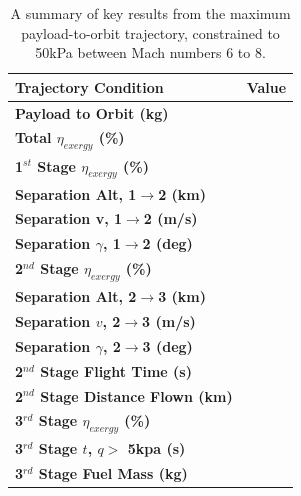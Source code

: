 	\begin{table}[ht]%
	\centering
\begin{tabular}{l c } 
	\hline \textbf{Trajectory Condition}
	& Value

	\\
	\hline \textbf{Payload to Orbit (kg)}
	& \textbf{\PayloadToOrbitqconstrainedNoReturn}
	\\
	\textbf{Total $\eta_{exergy}$ (\%)}
	& \textbf{\totalExergyEffqconstrainedNoReturn}
	\\
	\hline 
	\textbf{1$^{st}$ Stage $\eta_{exergy}$ (\%)}
	& \textbf{\firstExergyEffqconstrainedNoReturn}
	\\
	\textbf{Separation Alt, 1$\rightarrow$2 (km)}
	& \firstsecondSeparationAltqconstrainedNoReturn
	\\
	\textbf{Separation v, 1$\rightarrow$2 (m/s)}
	& \firstsecondSeparationvqconstrainedNoReturn
	\\
	\textbf{Separation $\gamma$, 1$\rightarrow$2 (deg)}
	& \firstsecondSeparationgammaqconstrainedNoReturn
	\\
	\hline 
	\textbf{2$^{nd}$ Stage $\eta_{exergy}$ (\%)}
	& \textbf{\secondExergyEffqconstrainedNoReturn}
	\\
	\textbf{Separation Alt, 2$\rightarrow$3 (km)}
	& \secondthirdSeparationAltqconstrainedNoReturn
	\\
	\textbf{Separation $v$, 2$\rightarrow$3 (m/s)}
	& \secondthirdSeparationvqconstrainedNoReturn
	\\
	\textbf{Separation $\gamma$, 2$\rightarrow$3 (deg)}
	& \secondthirdSeparationgammaqconstrainedNoReturn
	\\
	\textbf{2$^{nd}$ Stage Flight Time (s)}
	& \secondFlightTimeqconstrainedNoReturn
	\\
	\textbf{2$^{nd}$ Stage Distance Flown (km)}
	& \SecondDistqconstrainedNoReturn
	\\
	\hline 
	\textbf{3$^{rd}$ Stage $\eta_{exergy}$ (\%)}
	& \textbf{\thirddExergyEffqconstrainedNoReturn}
	\\
	\textbf{3$^{rd}$ Stage $t$, $q >$ 5kpa (s)}
	& \thirdqOverFiveqconstrainedNoReturn
	\\
	\textbf{3$^{rd}$ Stage Fuel Mass (kg)}
	& \thirdmFuelqconstrainedNoReturn
	\\
	\hline 
\end{tabular} 
\caption{A summary of key results from the maximum payload-to-orbit trajectory, constrained to 50kPa between Mach numbers 6 to 8.}
\label{tab:constrained68}

	\end{table}
		
